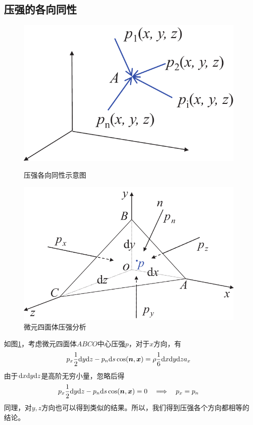 \subsection{压强的各向同性}

\begin{figure}[!htb]
	\centering
	\begin{minipage}{0.4 \linewidth}
		\centering
		\includegraphics[width=0.9\linewidth]{pic/压强各向同性1.pdf}
		\caption{压强各向同性示意图}
		\label{压强各向同性}
	\end{minipage}
	\begin{minipage}{0.5 \linewidth}
		\centering
		\includegraphics[width=0.8\linewidth]{pic/压强各向同性2.pdf}
		\vspace*{-1em}
		\caption{微元四面体压强分析}
		\label{压强各向同性证明}
	\end{minipage}
\end{figure}

如图\ref{压强各向同性证明}，考虑微元四面体$ABCO$中心压强$p$，对于$x$方向，有
\begin{equation*}
	p_x \dfrac{1}{2} {\rm{d}} y {\rm{d}} z - p_n {\rm{d}} s \cos(\bm{n}, \bm{x}) = \rho \dfrac{1}{6} {\rm{d}} x {\rm{d}} y {\rm{d}} z a_x
\end{equation*}
由于${\rm{d}} x {\rm{d}} y {\rm{d}} z $是高阶无穷小量，忽略后得
\begin{equation*}
	p_x \dfrac{1}{2} {\rm{d}} y {\rm{d}} z - p_n {\rm{d}} s \cos(\bm{n}, \bm{x}) = 0 \quad \Longrightarrow \quad p_x = p_n
\end{equation*}
同理，对$y,z$方向也可以得到类似的结果。所以，我们得到压强各个方向都相等的结论。


